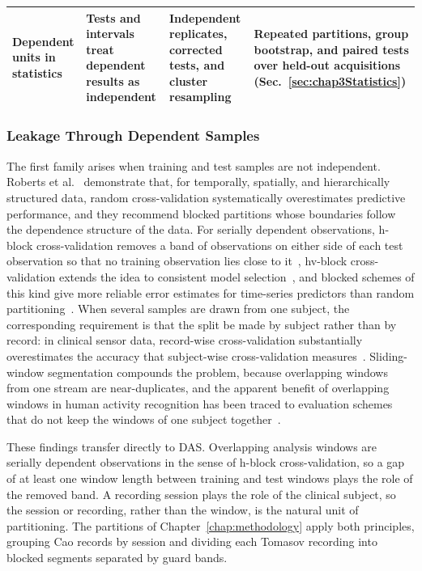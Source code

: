 \begin{table}[!htbp]
\begin{tabularx}{\textwidth}{@{}>{\raggedright\arraybackslash}p{2.3cm} >{\raggedright\arraybackslash}X >{\raggedright\arraybackslash}X >{\raggedright\arraybackslash}X@{}}
		\addlinespace[3pt]
		Dependent units in statistics & Tests and intervals treat dependent results as independent & Independent replicates, corrected tests, and cluster resampling~\cite{dietterich1998tests,nadeau2003inference,field2007clustered} & Repeated partitions, group bootstrap, and paired tests over held-out acquisitions (Sec.~\ref{sec:chap3Statistics})\\
		\bottomrule
	\end{tabularx}
\end{table}

\subsubsection{Leakage Through Dependent Samples}
\label{sec:chap2LeakDependent}
The first family arises when training and test samples are not independent. Roberts et al.~\cite{roberts2017crossvalidation} demonstrate that, for temporally, spatially, and hierarchically structured data, random cross-validation systematically overestimates predictive performance, and they recommend blocked partitions whose boundaries follow the dependence structure of the data. For serially dependent observations, h-block cross-validation removes a band of observations on either side of each test observation so that no training observation lies close to it~\cite{burman1994hblock}, hv-block cross-validation extends the idea to consistent model selection~\cite{racine2000hvblock}, and blocked schemes of this kind give more reliable error estimates for time-series predictors than random partitioning~\cite{bergmeir2012timeseries}. When several samples are drawn from one subject, the corresponding requirement is that the split be made by subject rather than by record: in clinical sensor data, record-wise cross-validation substantially overestimates the accuracy that subject-wise cross-validation measures~\cite{saeb2017usecase}. Sliding-window segmentation compounds the problem, because overlapping windows from one stream are near-duplicates, and the apparent benefit of overlapping windows in human activity recognition has been traced to evaluation schemes that do not keep the windows of one subject together~\cite{dehghani2019windows}.

These findings transfer directly to DAS. Overlapping analysis windows are serially dependent observations in the sense of h-block cross-validation, so a gap of at least one window length between training and test windows plays the role of the removed band. A recording session plays the role of the clinical subject, so the session or recording, rather than the window, is the natural unit of partitioning. The partitions of Chapter~\ref{chap:methodology} apply both principles, grouping Cao records by session and dividing each Tomasov recording into blocked segments separated by guard bands.

